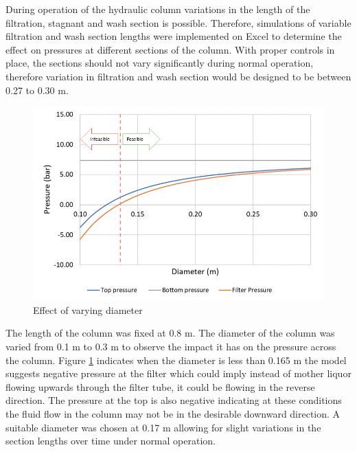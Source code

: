 During operation of the hydraulic column  variations in the length of the filtration, stagnant and wash section is possible. Therefore, simulations of variable filtration and wash section lengths were implemented on Excel to determine the effect on pressures at different sections of the column. With proper controls in place, the sections should not vary significantly during normal operation, therefore variation in filtration and wash section would be designed to be between 0.27 to 0.30 m.  
\begin{figure}
\centering
\includegraphics[width=\linewidth]{chapters/3-separation/figures/diameter.jpg}
\caption{Effect of varying diameter}
\label{fig:dia_col}
\end{figure}

The length of the column was fixed at 0.8 m. The diameter of the column was varied from 0.1 m to 0.3 m to observe the impact it has on the pressure across the column. Figure \ref{fig:dia_col} indicates when the diameter is less than 0.165 m the model suggests negative pressure at the filter which could imply instead of mother liquor flowing upwards through the filter tube, it could be flowing in the reverse direction. The pressure at the top is also negative indicating at these conditions the fluid flow in the column may not be in the desirable downward direction. A suitable diameter was chosen at 0.17 m allowing for slight variations in the section lengths over time under normal operation.

